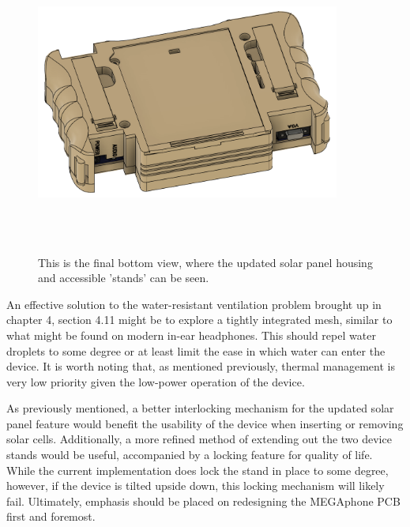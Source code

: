 \begin{figure} [h]
    \centering
    \includegraphics[width=10cm,height=10cm,keepaspectratio]{Figures/final_back_cad.png}
    \caption{This is the final bottom view, where the updated solar panel housing and accessible 'stands' can be seen.}
    \label{fig:FinalBOTTOM}
\end{figure}

An effective solution to the water-resistant ventilation problem brought up in chapter 4, section 4.11 might be to explore a tightly integrated mesh, similar to what might be found on modern in-ear headphones.
This should repel water droplets to some degree or at least limit the ease in which water can enter the device.
It is worth noting that, as mentioned previously, thermal management is very low priority given the low-power operation of the device.

As previously mentioned, a better interlocking mechanism for the updated solar panel feature would benefit the usability of the device when inserting or removing solar cells.
Additionally, a more refined method of extending out the two device stands would be useful, accompanied by a locking feature for quality of life.
While the current implementation does lock the stand in place to some degree, however, if the device is tilted upside down, this locking mechanism will likely fail.
Ultimately, emphasis should be placed on redesigning the MEGAphone PCB first and foremost.


